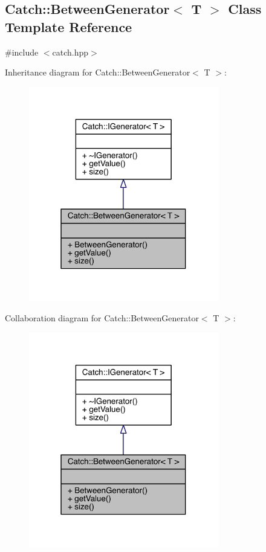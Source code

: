 \hypertarget{a00008}{}\subsection{Catch\+:\+:Between\+Generator$<$ T $>$ Class Template Reference}
\label{a00008}


{\ttfamily \#include $<$catch.\+hpp$>$}



Inheritance diagram for Catch\+:\+:Between\+Generator$<$ T $>$\+:\nopagebreak
\begin{figure}[H]
\begin{center}
\leavevmode
\includegraphics[width=235pt]{a00178}
\end{center}
\end{figure}


Collaboration diagram for Catch\+:\+:Between\+Generator$<$ T $>$\+:\nopagebreak
\begin{figure}[H]
\begin{center}
\leavevmode
\includegraphics[width=235pt]{a00179}
\end{center}
\end{figure}
